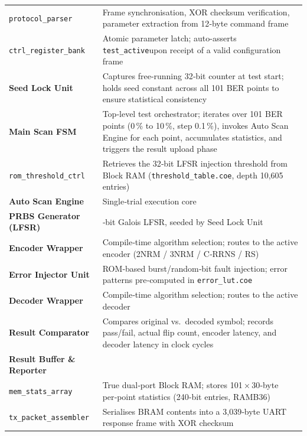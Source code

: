 {\begin{longtable}[]{@{}
  >{\raggedright\arraybackslash}p{}
  >{\raggedright\arraybackslash}p{}@{}}
\texttt{protocol\_parser} & Frame synchronisation, XOR checksum
verification, parameter extraction from 12‑byte command frame \\
\texttt{ctrl\_register\_bank} & Atomic parameter latch; auto-asserts
\texttt{test\_active}upon receipt of a valid configuration frame \\
\textbf{Seed Lock Unit}\hspace{0pt} & Captures free‑running 32‑bit
counter at test start; holds seed constant across all 101 BER points to
ensure statistical consistency \\
\textbf{Main Scan FSM}\hspace{0pt} & Top‑level test orchestrator;
iterates over 101 BER points (0\,\% to 10\,\%, step 0.1\,\%), invokes
Auto Scan Engine for each point, accumulates statistics, and triggers
the result upload phase \\
\texttt{rom\_threshold\_ctrl} & Retrieves the 32‑bit LFSR injection
threshold from Block RAM (\texttt{threshold\_table.coe}, depth 10,605
entries) \\
\textbf{Auto Scan Engine}\hspace{0pt} & Single‑trial execution core \\
\textbf{PRBS Generator (LFSR)}\hspace{0pt} & 32‑bit Galois LFSR, seeded
by Seed Lock Unit \\
\textbf{Encoder Wrapper}\hspace{0pt} & Compile‑time algorithm selection;
routes to the active encoder (2NRM / 3NRM / C‑RRNS / RS) \\
\textbf{Error Injector Unit}\hspace{0pt} & ROM‑based burst/random‑bit
fault injection; error patterns pre‑computed in
\texttt{error\_lut.coe} \\
\textbf{Decoder Wrapper}\hspace{0pt} & Compile‑time algorithm selection;
routes to the active decoder \\
\textbf{Result Comparator}\hspace{0pt} & Compares original vs.~decoded
symbol; records pass/fail, actual flip count, encoder latency, and
decoder latency in clock cycles \\
\textbf{Result Buffer \& Reporter}\hspace{0pt} & \\
\texttt{mem\_stats\_array} & True dual‑port Block RAM; stores
101\,×\,30‑byte per‑point statistics (240‑bit entries, RAMB36) \\
\texttt{tx\_packet\_assembler} & Serialises BRAM contents into a
3,039‑byte UART response frame with XOR checksum \\
\end{longtable}
}

